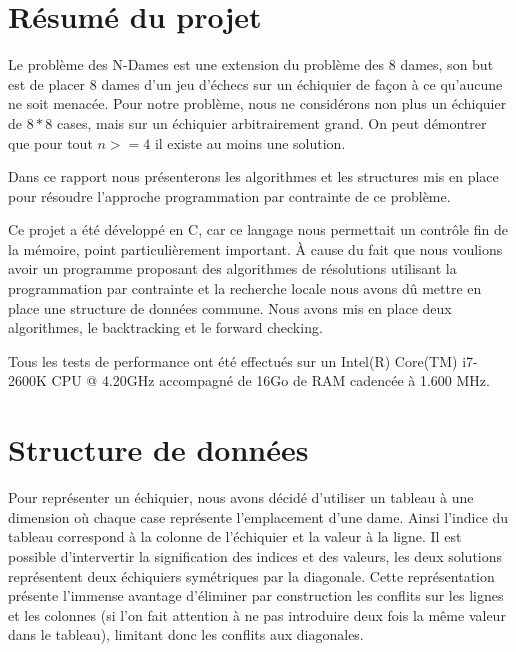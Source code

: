 \documentclass[10pt,a4paper]{report}
\begin{document}


\tableofcontents

\newpage

\section{Résumé du projet}

Le problème des N-Dames est une extension du problème des 8 dames, son but est de placer 8 dames d'un jeu d'échecs sur un échiquier de façon à ce qu'aucune ne soit menacée.
Pour notre problème, nous ne considérons non plus un échiquier de $8*8$ cases, mais sur un échiquier arbitrairement grand. On peut démontrer que pour tout $n >= 4$ il existe au moins une solution.

Dans ce rapport nous présenterons les algorithmes et les structures mis en place pour résoudre l'approche programmation par contrainte de ce problème.

Ce projet a été développé en C, car ce langage nous permettait un contrôle fin de la mémoire, point particulièrement important.
À cause du fait que nous voulions avoir un programme proposant des algorithmes de résolutions utilisant la programmation par contrainte et la recherche locale nous avons dû mettre en place une structure de données commune.
Nous avons mis en place deux algorithmes, le backtracking et le forward checking.

Tous les tests de performance ont été effectués sur un Intel(R) Core(TM) i7-2600K CPU @ 4.20GHz accompagné de 16Go de RAM cadencée à 1.600 MHz.


\section{Structure de données}

Pour représenter un échiquier, nous avons décidé d'utiliser un tableau à une dimension où chaque case représente l'emplacement d'une dame.
Ainsi l'indice du tableau correspond à la colonne de l'échiquier et la valeur à la ligne.
Il est possible d'intervertir la signification des indices et des valeurs, les deux solutions représentent deux échiquiers symétriques par la diagonale.
Cette représentation présente l'immense avantage d'éliminer par construction les conflits sur les lignes et les colonnes (si l’on fait attention à ne pas introduire deux fois la même valeur dans le tableau),
limitant donc les conflits aux diagonales.
\end{document}
